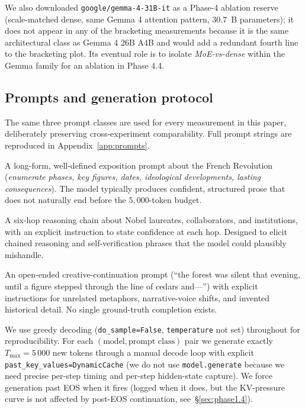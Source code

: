 \documentclass[11pt,letterpaper]{article}
\begin{document}
We also downloaded \texttt{google/gemma-4-31B-it} as a Phase-4 ablation
reserve (scale-matched dense, same Gemma 4 attention pattern, $30.7$~B
parameters); it does not appear in any of the bracketing measurements
because it is the same architectural class as Gemma 4 26B A4B and would
add a redundant fourth line to the bracketing plot. Its eventual role is
to isolate \emph{MoE-vs-dense} within the Gemma family for an ablation
in Phase 4.4.

\subsection{Prompts and generation protocol}
\label{sec:setup-prompts}

The same three prompt classes are used for every measurement in this
paper, deliberately preserving cross-experiment comparability. Full
prompt strings are reproduced in Appendix~\ref{app:prompts}.

\begin{description}[leftmargin=1.5em, itemsep=0pt]
\item[\textsc{factual}] A long-form, well-defined exposition prompt
about the French Revolution (\textit{enumerate phases, key figures,
dates, ideological developments, lasting consequences}). The model
typically produces confident, structured prose that does not naturally
end before the $5{,}000$-token budget.
\item[\textsc{multi-hop}] A six-hop reasoning chain about Nobel laureates,
collaborators, and institutions, with an explicit instruction to state
confidence at each hop. Designed to elicit chained reasoning and
self-verification phrases that the model could plausibly mishandle.
\item[\textsc{ambiguous}] An open-ended creative-continuation prompt
(``the forest was silent that evening, until a figure stepped through
the line of cedars and—'') with explicit instructions for unrelated
metaphors, narrative-voice shifts, and invented historical detail. No
single ground-truth completion exists.
\end{description}

We use greedy decoding (\verb|do_sample=False|, \verb|temperature| not
set) throughout for reproducibility. For each
$(\text{model}, \text{prompt class})$ pair we generate exactly $T_{\max}
= 5\,000$ new tokens through a manual decode loop with explicit
\verb|past_key_values=DynamicCache| (we do not use \verb|model.generate|
because we need precise per-step timing and per-step hidden-state
capture). We force generation past EOS when it fires (logged when it
does, but the KV-pressure curve is not affected by post-EOS
continuation, see~\S\ref{sec:phase1.4}).
\end{document}
